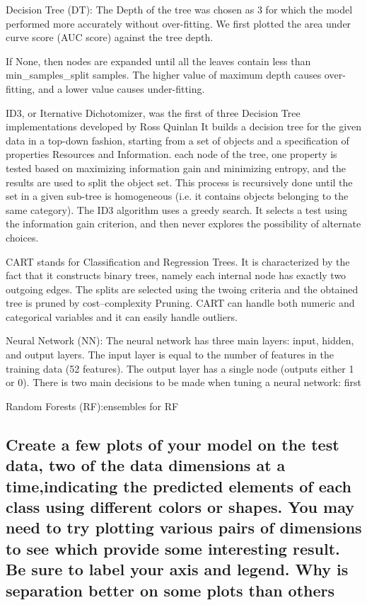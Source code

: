 Decision Tree (DT): The Depth of the tree was chosen as 3 for which the model performed more accurately without over-fitting. We first plotted the area under curve score (AUC score) against the tree depth. 

If None, then nodes are expanded until all the leaves contain less than min\_samples\_split samples. The higher value of maximum depth causes over-fitting, and a lower value causes under-fitting\cite{ref_url1}.


ID3, or Iternative Dichotomizer, was the first of three Decision Tree implementations developed by Ross Quinlan
It builds a decision tree for the given data in a top-down fashion, starting from a set of objects and a specification of properties Resources and Information. each node of the tree, one property is tested based on maximizing information gain and minimizing entropy, and the results are used to split the object set. This process is recursively done until the set in a given sub-tree is homogeneous (i.e. it contains objects belonging to the same category). The ID3 algorithm uses a greedy search. It selects a test using the information gain criterion, and then never explores the possibility of alternate choices.

CART stands for Classification and Regression Trees. It is characterized by the fact that it constructs binary trees, namely each internal node has exactly two outgoing edges. The splits are selected using the twoing criteria and the obtained tree is pruned by cost–complexity Pruning. CART can handle both numeric and categorical variables and it can easily handle outliers.

Neural Network (NN): The neural network has three main layers: input, hidden, and output layers. The input layer is equal to the number of features in the training data (52 features). The output layer has a single node (outputs either 1 or 0). There is two main decisions to be made when tuning a neural network: first

Random Forests (RF):ensembles for RF
\subsection{Create a few plots of your model on the test data, two of the data dimensions at a time,indicating the predicted elements of each class using different colors or shapes. You may need to try plotting various pairs of dimensions to see which provide some interesting result. Be sure to label your axis and legend. Why is separation better on some plots than others}

